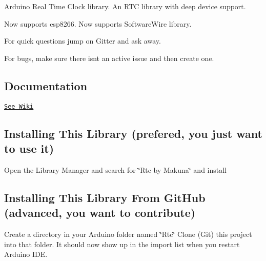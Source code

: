 Arduino Real Time Clock library. An R\+TC library with deep device support.

\href{https://www.paypal.com/cgi-bin/webscr?cmd=_s-xclick&hosted_button_id=6AA97KE54UJR4}{\tt }

Now supports esp8266. Now supports Software\+Wire library.

For quick questions jump on Gitter and ask away. \href{https://gitter.im/Makuna/Rtc?utm_source=badge&utm_medium=badge&utm_campaign=pr-badge}{\tt }

For bugs, make sure there isn\textquotesingle{}t an active issue and then create one.

\subsection*{Documentation}

\href{https://github.com/Makuna/Rtc/wiki}{\tt See Wiki}

\subsection*{Installing This Library (prefered, you just want to use it)}

Open the Library Manager and search for \char`\"{}\+Rtc by Makuna\char`\"{} and install

\subsection*{Installing This Library From Git\+Hub (advanced, you want to contribute)}

Create a directory in your Arduino folder named \char`\"{}\+Rtc\char`\"{} Clone (Git) this project into that folder. It should now show up in the import list when you restart Arduino I\+DE. 